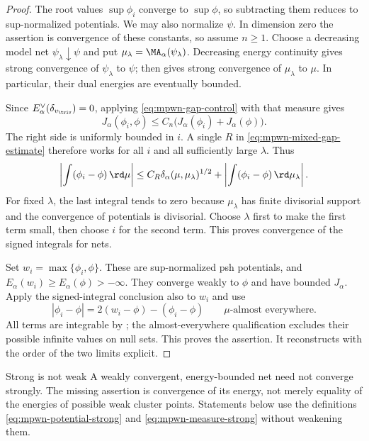 \begin{proof}
The root values $\sup\phi_i$ converge to $\sup\phi$, so
subtracting them reduces to sup-normalized potentials.
We may also normalize $\psi$.  In dimension zero the assertion
is convergence of these constants, so assume $n\geq1$.
Choose a decreasing model net $\psi_\lambda\downarrow\psi$
and put $\mu_\lambda=\MA_\alpha(\psi_\lambda)$.
Decreasing energy continuity gives strong convergence of
$\psi_\lambda$ to $\psi$; 
then gives strong convergence of $\mu_\lambda$ to $\mu$.
In particular, their dual energies are eventually bounded.

Since $E_\alpha^\vee(\delta_{v_{\triv}})=0$, applying
\eqref{eq:mpwn-gap-control} with that measure gives
\[
 J_\alpha(\phi_i,\phi)
             \leq C_n\bigl(J_\alpha(\phi_i)+J_\alpha(\phi)\bigr).
\]
The right side is uniformly bounded in $i$.  A single $R$ in
\eqref{eq:mpwn-mixed-gap-estimate} therefore works for all $i$
and all sufficiently large $\lambda$.  Thus
\[
 \left|\int(\phi_i-\phi)\,\rd\mu\right|
 \leq C_R\delta_\alpha(\mu,\mu_\lambda)^{1/2}
                  +\left|\int(\phi_i-\phi)\,\rd\mu_\lambda\right|.
\]
For fixed $\lambda$, the last integral tends to zero because
$\mu_\lambda$ has finite divisorial support and the convergence
of potentials is divisorial.  Choose $\lambda$ first to make
the first term small, then choose $i$ for the second term.
This proves convergence of the signed integrals for nets.

Set $w_i=\max\{\phi_i,\phi\}$.  These are sup-normalized psh
potentials, and $E_\alpha(w_i)\geq E_\alpha(\phi)>-\infty$.
They converge weakly to $\phi$ and have bounded $J_\alpha$.
Apply the signed-integral conclusion also to $w_i$ and use
\[
 |\phi_i-\phi|=2(w_i-\phi)-(\phi_i-\phi)
 \qquad\mu\text{-almost everywhere}.
\]
All terms are integrable by ;
the almost-everywhere qualification excludes their possible
infinite values on null sets.  This proves the assertion.
It reconstructs \cite[Lemma~5.0.5]{MPWN25} with the order of the
two limits explicit.
\end{proof}


\noindent\begin{minipage}{\linewidth}
\begin{warning}{Strong is not weak}
\label{warn:mpwn-strong-not-weak}
A weakly convergent, energy-bounded net need not converge strongly.  The
missing assertion is convergence of its energy, not merely equality of the
energies of possible weak cluster points.  Statements below use the
definitions \eqref{eq:mpwn-potential-strong} and
\eqref{eq:mpwn-measure-strong} without weakening them.
\end{warning}
\end{minipage}\par

